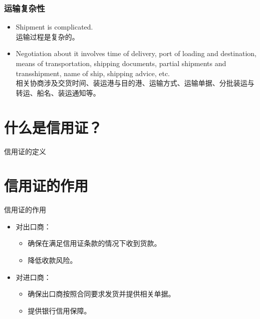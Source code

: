 \documentclass[12pt]{beamer}
\begin{document}
\begin{frame}[allowframebreaks]
\frametitle{运输复杂性}
\begin{itemize}
\item Shipment is complicated. \\
\small{运输过程是复杂的。}

\item Negotiation about it involves time of delivery, port of loading and destination, means of transportation, shipping documents, partial shipments and transshipment, name of ship, shipping advice, etc. \\
\small{相关协商涉及交货时间、装运港与目的港、运输方式、运输单据、分批装运与转运、船名、装运通知等。}
\end{itemize}
\end{frame}
\section{什么是信用证？}
\begin{frame}{信用证的定义}
\end{frame}

\section{信用证的作用}
\begin{frame}{信用证的作用}
    \begin{itemize}
        \item 对出口商：
        \begin{itemize}
            \item 确保在满足信用证条款的情况下收到货款。
            \item 降低收款风险。
        \end{itemize}
        \item 对进口商：
        \begin{itemize}
            \item 确保出口商按照合同要求发货并提供相关单据。
            \item 提供银行信用保障。
        \end{itemize}
    \end{itemize}
\end{frame}
\end{document}
